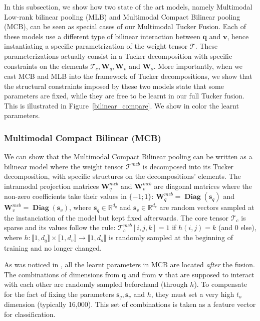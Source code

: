 \documentclass[10pt,twocolumn,letterpaper]{article}
\DeclareMathOperator{\Diag}{Diag}
\newcommand{\tens}[1]{
\bm{\mathcal{#1}}
}
\newcommand{\mat}[1]{\bm{#1}}
\newcommand{\q}{\mathbf{q}}
\newcommand{\vv}{\mathbf{v}}
\begin{document}
In this subsection, we show how two state of the art models, namely Multimodal Low-rank bilinear pooling \cite{Kim2017} (MLB) and Multimodal Compact Bilinear pooling \cite{fukui16mcb} (MCB), can be seen as special cases of our Multimodal Tucker Fusion. Each of these models use a different type of bilinear interaction between $\q$ and $\vv$, hence instantiating a specific parametrization of the weight tensor $\tens{T}$. These parameterizations actually consist  in a Tucker decomposition with specific constraints on the elements $\tens{T}_c,\mat{W}_q,\mat{W}_v$ and $\mat{W}_o$. More importantly, when we cast MCB and MLB into the framework of Tucker decompositions, we show that the structural constraints imposed by these two models state that some parameters are fixed, while they are free to be learnt in our full Tucker fusion. This is illustrated in Figure~\ref{bilinear_compare}. We show in color the learnt parameters.

\subsubsection{Multimodal Compact Bilinear (MCB)}
We can show that the Multimodal Compact Bilinear pooling \cite{fukui16mcb} can be written as a bilinear model where the weight tensor $\tens{T}^{mcb}$ is decomposed into its Tucker decomposition, with specific structures on the decompositions' elements. The intramodal projection matrices $\mat{W}_q^{mcb}$ and $\mat{W}_v^{mcb}$ are diagonal matrices where the non-zero coefficients take their values in $\{-1;1\}$:
$\mat{W}_q^{mcb} = \mat{\Diag{}} (\mathbf{s}_q)$ and $\mat{W}_v^{mcb} = \mat{\Diag{}} (\mathbf{s}_v)$, where $\mathbf{s}_q \in \mathbb{R}^{d_q}$ and $\mathbf{s}_v \in \mathbb{R}^{d_v}$ are random vectors sampled at the instanciation of the model but kept fixed afterwards. The core tensor $\tens{T}_c$ is sparse and its values follow the rule: $\tens{T}_c^{mcb}[i,j,k] = 1$  if  $h(i,j) = k$ (and $0$  else), where $h: \llbracket 1,d_q \rrbracket \times \llbracket 1,d_v \rrbracket \rightarrow \llbracket 1, d_o\rrbracket$ is randomly sampled at the beginning of training and no longer changed.

As was noticed in \cite{Kim2017}, all the learnt parameters in MCB are located \emph{after} the fusion. The combinations of dimensions from $\q$ and from $\vv$ that are supposed to interact with each other are randomly sampled beforehand (through $h$). To compensate for the fact of fixing the parameters $\mathbf{s}_q, \mathbf{s}_v$ and $h$, they must set a very high $t_o$ dimension (typically 16,000). This set of combinations is taken as a feature vector for classification. 
\end{document}
